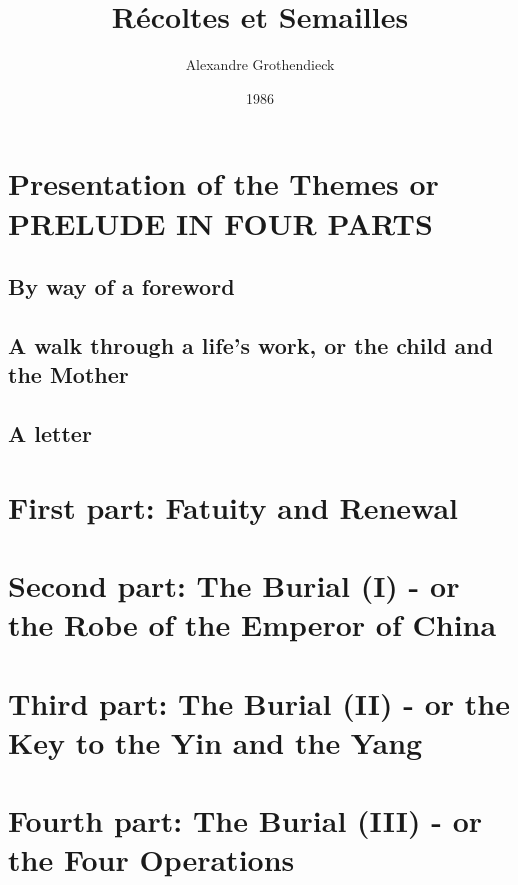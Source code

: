 \documentclass{book}
\begin{document}
\title{R\'ecoltes et Semailles}
\author{Alexandre Grothendieck}
\date{1986}
\maketitle
\tableofcontents

\part*{Presentation of the Themes or PRELUDE IN FOUR PARTS}

\chapter{By way of a foreword}


\chapter{A walk through a life's work, or the child and the Mother}


\chapter{A letter}


\part{First part: Fatuity and Renewal}
\label{part:I}

\part{Second part: The Burial (I) - or the Robe of the Emperor of China}
\label{part:II}



% 

\part{Third part: The Burial (II) - or the Key to the Yin and the Yang}
\label{part:III}


\part{Fourth part: The Burial (III) - or the Four Operations}
\label{part:IV}
\end{document}
